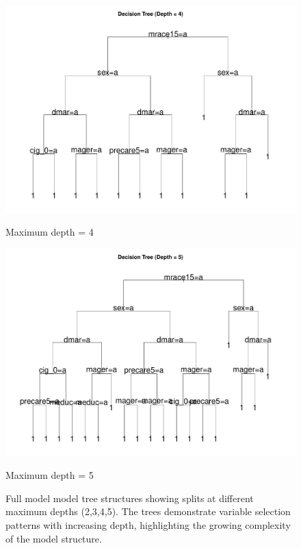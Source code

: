 \begin{figure}[p]
    \vspace{1cm}
    
    \begin{minipage}{0.48\textwidth}
        \centering
        \includegraphics[width=\linewidth]{chapters/chapter3/figures/depth/plot1/decision_tree_depth_4_2021_large.pdf}
        \caption*{Maximum depth = 4}
    \end{minipage}
    \hspace{0.02\textwidth}
    \begin{minipage}{0.48\textwidth}
        \centering
        \includegraphics[width=\linewidth]{chapters/chapter3/figures/depth/plot1/decision_tree_depth_5_2021_large.pdf}
        \caption*{Maximum depth = 5}
    \end{minipage}
    \caption{Full model model tree structures showing splits at different maximum depths (2,3,4,5). The trees demonstrate variable selection patterns with increasing depth, highlighting the growing complexity of the model structure.}
    \label{fig:trees-comparison-full}
\end{figure}

